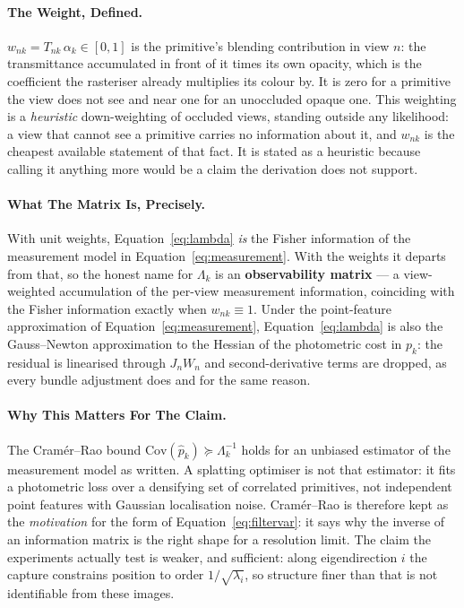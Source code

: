 \paragraph{The Weight, Defined.} $w_{nk} = T_{nk}\,\alpha_k \in [0,1]$ is the
primitive's blending contribution in view $n$: the transmittance accumulated in
front of it times its own opacity, which is the coefficient the rasteriser already multiplies its colour by. It is zero for a primitive the view
does not see and near one for an unoccluded opaque one. This weighting is a \emph{heuristic} down-weighting of occluded views, standing outside any
likelihood:
a view that cannot see a primitive carries no information about it, and $w_{nk}$
is the cheapest available statement of that fact. It is stated as a heuristic
because calling it anything more would be a claim the derivation does not
support.

\paragraph{What The Matrix Is, Precisely.} With unit weights,
Equation~\eqref{eq:lambda} \emph{is} the Fisher information of the measurement
model in Equation~\eqref{eq:measurement}. With the weights it departs from that, so the honest name for $\Lambda_k$ is an
\textbf{observability matrix} --- a
view-weighted accumulation of the per-view measurement information, coinciding
with the Fisher information exactly when $w_{nk} \equiv 1$. Under the
point-feature approximation of Equation~\eqref{eq:measurement},
Equation~\eqref{eq:lambda} is also the Gauss--Newton approximation to the Hessian
of the photometric cost in $p_k$: the residual is linearised through $J_nW_n$ and second-derivative terms are dropped, as every bundle adjustment does and for
the same reason.

\paragraph{Why This Matters For The Claim.} The Cram\'er--Rao bound
$\mathrm{Cov}(\hat p_k) \succeq \Lambda_k^{-1}$ holds for an unbiased estimator
of the measurement model as written. A splatting optimiser is not that estimator:
it fits a photometric loss over a densifying set of correlated primitives, not
independent point features with Gaussian localisation noise. Cram\'er--Rao is
therefore kept as the \emph{motivation} for the form of Equation~\eqref{eq:filtervar}: it says why
the inverse of an information matrix is the right shape for a resolution limit.
The claim the experiments actually test is weaker, and sufficient: along eigendirection $i$ the capture constrains position
to order $1/\sqrt{\lambda_i}$, so structure finer than that is not identifiable
from these images.

